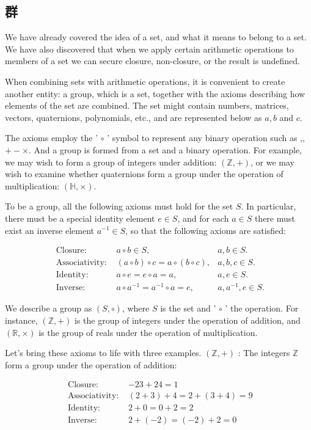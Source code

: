 \subsection{群}
We have already covered the idea of a set, and what it means to belong to a set. We have also discovered that when we apply certain arithmetic operations to members of a set we can secure closure, non-closure, or the result is undefined.

When combining sets with arithmetic operations, it is convenient to create another entity: a group, which is a set, together with the axioms describing how elements of the set are combined. The set might contain numbers, matrices, vectors, quaternions, polynomials, etc., and are represented below as $a, b$ and $c$.

The axioms employ the ' $\circ$ ' symbol to represent any binary operation such as ,,$+- \times$. And a group is formed from a set and a binary operation. For example, we may wish to form a group of integers under addition: $(\mathbb{Z},+)$, or we may wish to examine whether quaternions form a group under the operation of multiplication: $(\mathbb{H}, \times)$.

To be a group, all the following axioms must hold for the set $S$. In particular, there must be a special identity element $e \in S$, and for each $a \in S$ there must exist an inverse element $a^{-1} \in S$, so that the following axioms are satisfied:

$$
\begin{array}{rlr}
\text { Closure: } & a \circ b \in S, & a, b \in S . \\
\text { Associativity: } & (a \circ b) \circ c=a \circ(b \circ c), & a, b, c \in S . \\
\text { Identity: } & a \circ e=e \circ a=a, & a, e \in S . \\
\text { Inverse: } & a \circ a^{-1}=a^{-1} \circ a=e, & a, a^{-1}, e \in S .
\end{array}
$$

We describe a group as $(S, \circ)$, where $S$ is the set and ' $\circ$ ' the operation. For instance, $(\mathbb{Z},+)$ is the group of integers under the operation of addition, and $(\mathbb{R}, \times)$ is the group of reals under the operation of multiplication.

Let's bring these axioms to life with three examples. $(\mathbb{Z},+)$ : The integers $\mathbb{Z}$ form a group under the operation of addition:

$$
\begin{aligned}
\text { Closure: } & -23+24=1 \\
\text { Associativity: } & (2+3)+4=2+(3+4)=9 \\
\text { Identity: } & 2+0=0+2=2 \\
\text { Inverse: } & 2+(-2)=(-2)+2=0
\end{aligned}
$$

